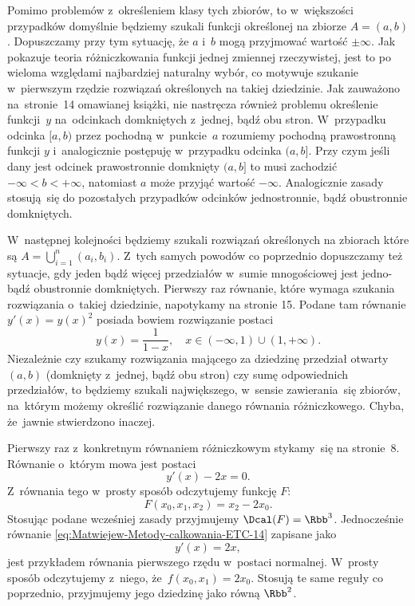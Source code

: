 \documentclass[a4paper,11pt]{article}
\numberwithin{equation}{section}
\begin{document}
Pomimo problemów z~określeniem klasy tych zbiorów, to w~większości
przypadków domyślnie będziemy szukali funkcji określonej na zbiorze
$A = ( a, b )$. Dopuszczamy przy tym sytuację, że $a$ i~$b$ mogą
przyjmować wartość $\pm \infty$. Jak pokazuje teoria różniczkowania
funkcji jednej zmiennej rzeczywistej, jest to po wieloma względami
najbardziej naturalny wybór, co motywuje szukanie w~pierwszym rzędzie
rozwiązań określonych na takiej dziedzinie. Jak zauważono na~stronie~14
omawianej książki, nie nastręcza również problemu określenie funkcji~$y$
na~odcinkach domkniętych z~jednej, bądź obu stron. W~przypadku odcinka
$[ a, b )$ przez pochodną w~punkcie~$a$ rozumiemy pochodną prawostronną
funkcji $y$ i~analogicznie postępuję w~przypadku odcinka $( a, b ]$. Przy
czym jeśli dany jest odcinek prawostronnie domknięty $( a, b ]$ to musi
zachodzić $-\infty < b < +\infty$, natomiast $a$ może przyjąć wartość $-\infty$.
Analogicznie zasady stosują~się do pozostałych przypadków odcinków
jednostronnie, bądź obustronnie domkniętych.

W~następnej kolejności będziemy szukali rozwiązań określonych na zbiorach
które są $A = \bigcup_{ i = 1 }^{ n } ( a_{ i }, b_{ i } )$. Z~tych samych
powodów co poprzednio dopuszczamy też sytuacje, gdy jeden bądź więcej
przedziałów w~sumie mnogościowej jest jedno- bądź obustronnie domkniętych.
Pierwszy raz równanie, które wymaga szukania rozwiązania o~takiej
dziedzinie, napotykamy na stronie 15. Podane tam równanie
$y'( x ) = y( x )^{ 2 }$
posiada bowiem rozwiązanie postaci
\begin{equation}
  \label{eq:Czym-jest-rownanie-ETC-09}
  y( x ) = \frac{ 1 }{ 1 - x }, \quad
  x \in ( -\infty, 1 ) \cup ( 1, +\infty ).
\end{equation}
Niezależnie czy szukamy rozwiązania mającego za dziedzinę przedział otwarty
$( a, b )$ (domknięty z~jednej, bądź obu stron) czy sumę odpowiednich
przedziałów, to będziemy szukali największego, w~sensie zawierania~się
zbiorów, na~którym możemy określić rozwiązanie danego równania
różniczkowego. Chyba, że~jawnie stwierdzono inaczej.

Pierwszy raz z~konkretnym równaniem różniczkowym stykamy~się na stronie~8.
Równanie o~którym mowa jest postaci
\begin{equation}
  \label{eq:Czym-jest-rownanie-ETC-10}
  y'( x ) - 2 x = 0.
\end{equation}
Z~równania tego w~prosty sposób odczytujemy funkcję $F$:
\begin{equation}
  \label{eq:Czym-jest-rownanie-ETC-11}
  F( x_{ 0 }, x_{ 1 }, x_{ 2 } ) = x_{ 2 } - 2 x_{ 0 }.
\end{equation}
Stosując podane wcześniej zasady przyjmujemy $\Dcal( F ) = \Rbb^{ 3 }$.
Jednocześnie równanie \eqref{eq:Matwiejew-Metody-calkowania-ETC-14} zapisane
jako
\begin{equation}
  \label{eq:Czym-jest-rownanie-ETC-12}
  y'( x ) = 2 x,
\end{equation}
jest przykładem równania pierwszego rzędu w~postaci normalnej. W~prosty
sposób odczytujemy z~niego, że~$f( x_{ 0 }, x_{ 1 } ) = 2 x_{ 0 }$. Stosują
te same reguły co poprzednio, przyjmujemy jego dziedzinę jako równą
$\Rbb^{ 2 }$.
\end{document}
